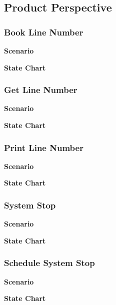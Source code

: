 \subsection{Product Perspective}




\subsubsection{Book Line Number}
\textbf{Scenario}

\textbf{State Chart}


\subsubsection{Get Line Number}

\textbf{Scenario}

\textbf{State Chart}

\subsubsection{Print Line Number}

\textbf{Scenario}

\textbf{State Chart}

\subsubsection{System Stop}

\textbf{Scenario}

\textbf{State Chart}

\subsubsection{Schedule System Stop}

\textbf{Scenario}

\textbf{State Chart}



